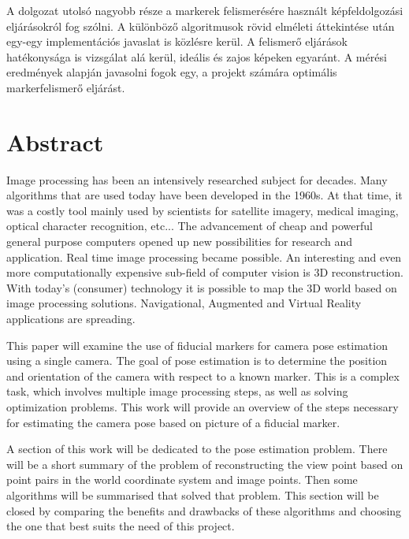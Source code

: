 A dolgozat utolsó nagyobb része a markerek felismerésére használt képfeldolgozási eljárásokról fog szólni.
A különböző algoritmusok rövid elméleti áttekintése után egy-egy implementációs javaslat is közlésre kerül.
A felismerő eljárások hatékonysága is vizsgálat alá kerül, ideális és zajos képeken egyaránt.
A mérési eredmények alapján javasolni fogok egy, a projekt számára optimális markerfelismerő eljárást.
\vfill

\chapter*{Abstract}
Image processing has been an intensively researched subject for decades.
Many algorithms that are used today have been developed in the 1960s.
At that time, it was a costly tool mainly used by scientists for satellite imagery, medical imaging, optical character recognition, etc...
The advancement of cheap and powerful general purpose computers opened up new possibilities for research and application.
Real time image processing became possible.
An interesting and even more computationally expensive sub-field of computer vision is 3D reconstruction.
With today's (consumer) technology it is possible to map the 3D world based on image processing solutions.
Navigational, Augmented and Virtual Reality applications are spreading.

This paper will examine the use of fiducial markers for camera pose estimation using a single camera.
The goal of pose estimation is to determine the position and orientation of the camera with respect to a known marker.
This is a complex task, which involves multiple image processing steps, as well as solving optimization problems.
This work will provide an overview of the steps necessary for estimating the camera pose based on picture of a fiducial marker.

A section of this work will be dedicated to the pose estimation problem.
There will be a short summary of the problem of reconstructing the view point based on point pairs in the world coordinate system and image points.
Then some algorithms will be summarised that solved that problem.
This section will be closed by comparing the benefits and drawbacks of these algorithms and choosing the one that best suits the need of this project.

